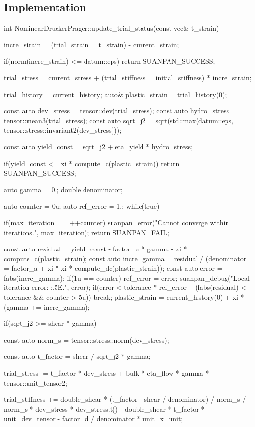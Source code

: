 \subsection{Implementation}
\begin{cppcode}
int NonlinearDruckerPrager::update_trial_status(const vec& t_strain) {
    incre_strain = (trial_strain = t_strain) - current_strain;

    if(norm(incre_strain) <= datum::eps) return SUANPAN_SUCCESS;

    trial_stress = current_stress + (trial_stiffness = initial_stiffness) * incre_strain;

    trial_history = current_history;
    auto& plastic_strain = trial_history(0);

    const auto dev_stress = tensor::dev(trial_stress);
    const auto hydro_stress = tensor::mean3(trial_stress);
    const auto sqrt_j2 = sqrt(std::max(datum::eps, tensor::stress::invariant2(dev_stress)));

    const auto yield_const = sqrt_j2 + eta_yield * hydro_stress;

    if(yield_const <= xi * compute_c(plastic_strain)) return SUANPAN_SUCCESS;

    auto gamma = 0.;
    double denominator;

    auto counter = 0u;
    auto ref_error = 1.;
    while(true) {
        if(max_iteration == ++counter) {
            suanpan_error("Cannot converge within {} iterations.\n", max_iteration);
            return SUANPAN_FAIL;
        }

        const auto residual = yield_const - factor_a * gamma - xi * compute_c(plastic_strain);
        const auto incre_gamma = residual / (denominator = factor_a + xi * xi * compute_dc(plastic_strain));
        const auto error = fabs(incre_gamma);
        if(1u == counter) ref_error = error;
        suanpan_debug("Local iteration error: {:.5E}.\n", error);
        if(error < tolerance * ref_error || (fabs(residual) < tolerance && counter > 5u)) break;
        plastic_strain = current_history(0) + xi * (gamma += incre_gamma);
    }

    if(sqrt_j2 >= shear * gamma) {
        const auto norm_s = tensor::stress::norm(dev_stress);

        const auto t_factor = shear / sqrt_j2 * gamma;

        trial_stress -= t_factor * dev_stress + bulk * eta_flow * gamma * tensor::unit_tensor2;

        trial_stiffness += double_shear * (t_factor - shear / denominator) / norm_s / norm_s * dev_stress * dev_stress.t() - double_shear * t_factor * unit_dev_tensor - factor_d / denominator * unit_x_unit;

}}
\end{cppcode}
